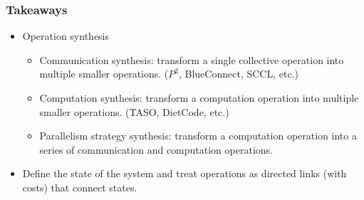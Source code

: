 \documentclass[12pt,aspectratio=169]{beamer}
\begin{document}

    \begin{frame}
        \frametitle{Takeaways}

        \begin{itemize}
            \setlength{\itemsep}{.8em}
            \item Operation synthesis
            \begin{itemize}
                \item Communication synthesis: transform a single collective operation into multiple smaller operations. ($P^2$, BlueConnect, SCCL, etc.)
                \item Computation synthesis: transform a computation operation into multiple smaller operations. (TASO, DietCode, etc.)
                \item Parallelism strategy synthesis: transform a computation operation into a series of communication and computation operations.
            \end{itemize}
            \item Define the state of the system and treat operations as directed links (with costs) that connect states.
        \end{itemize}
    \end{frame}

    \appendix

\end{document}
